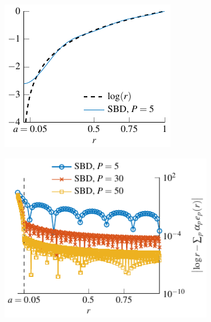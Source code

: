 \documentclass{article}
\begin{document}
\begin{figure}[ht]
	\newlength{\plotwidth}
	\setlength{\plotwidth}{0.49\textwidth}
	\centering		
	\begin{subfigure}[b]{\plotwidth}
		\centering
		\includegraphics[scale = 0.85]{LogVsSBD}
		\caption{}
	\end{subfigure}%
	\hspace{1.5pt}
	\begin{subfigure}[b]{\plotwidth}
		\centering
		\includegraphics[scale = 0.85]{ErrorVariousGamma}
		\caption{}
	\end{subfigure}%
																																																																								

\end{figure}
\end{document}
